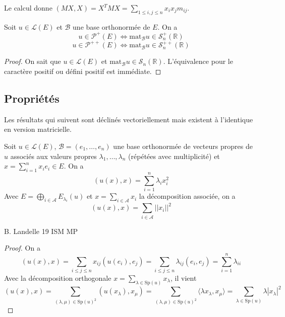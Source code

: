 \begin{remark}

Le calcul donne $(MX,X) = X^T MX = \sum_{1 \leq i,j \leq n} x_i x_j m_{ij}$.

\end{remark}

\begin{proposition}
\label{prop:30}

Soit $u \in \mathcal{L}(E)$ et $\mathcal{B}$ une base orthonormée de $E$. On a
\[
u \in \mathcal{P}^{+}(E) \Leftrightarrow \text{mat}_{\mathcal{B}} u \in \mathcal{S}_n^{+}(\mathbb{R})
\]
\[
u \in \mathcal{P}^{++}(E) \Leftrightarrow \text{mat}_{\mathcal{B}} u \in \mathcal{S}_n^{++}(\mathbb{R})
\]
\end{proposition}

\begin{proof}

On sait que $u \in \mathcal{L}(E)$ et $\text{mat}_{\mathcal{B}} u \in \mathcal{S}_n(\mathbb{R})$. L'équivalence pour le caractère positif ou défini positif est immédiate.

\end{proof}

\subsection{Propriétés}

Les résultats qui suivent sont déclinés vectoriellement mais existent à l'identique en version matricielle.

\begin{proposition}
\label{prop:31}

Soit $u \in \mathcal{L}(E)$, $\mathcal{B} = (e_1, \dots, e_n)$ une base orthonormée de vecteurs propres de $u$ associés aux valeurs propres $\lambda_1, \dots, \lambda_n$ (répétées avec multiplicité) et $x = \sum_{i=1}^n x_i e_i \in E$. On a
\[
(u(x),x) = \sum_{i=1}^n \lambda_i x_i^2
\]
Avec $E = \bigoplus_{i \in \mathcal{A}} E_{\lambda_i}(u)$ et $x = \sum_{i \in \mathcal{A}} x_i$ la décomposition associée, on a
\[
(u(x),x) = \sum_{i \in \mathcal{A}} ||x_i||^2
\]

B. Landelle
\hspace{1cm}
19
\hspace{1cm}
ISM MP


\end{proposition}

\begin{proof}

On a
\[
(u(x), x) = \sum_{i \leq j \leq n} x_{ij} (u(e_i), e_j) = \sum_{i \leq j \leq n} \lambda_{ij} (e_i, e_j) = \sum_{i=1}^n \lambda_{ii}
\]
Avec la décomposition orthogonale $x = \sum_{\lambda \in \text{Sp}(u)} x_\lambda$, il vient
\[
(u(x), x) = \sum_{(\lambda, \mu) \in \text{Sp}(u)^2} (u(x_\lambda), x_\mu) = \sum_{(\lambda, \mu) \in \text{Sp}(u)^2} \langle \lambda x_\lambda, x_\mu \rangle = \sum_{\lambda \in \text{Sp}(u)} \lambda |x_\lambda|^2
\]
\end{proof}

